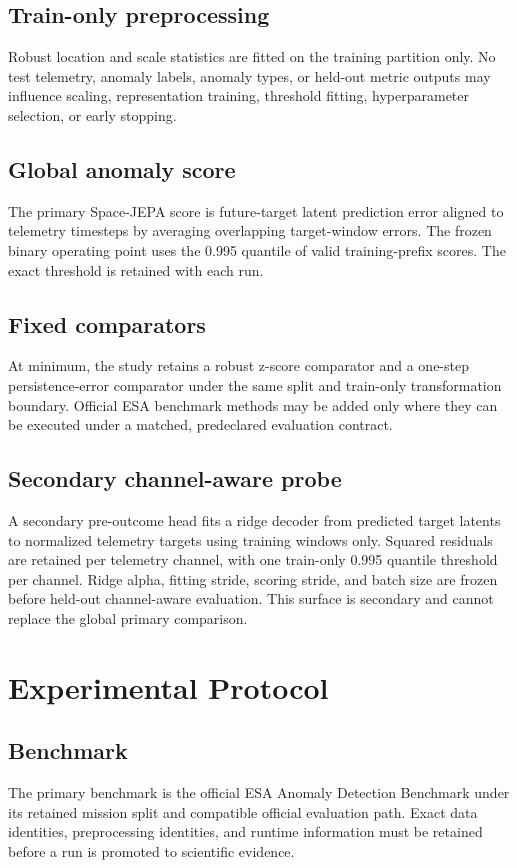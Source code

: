 \documentclass[conference]{IEEEtran}
\begin{document}
\subsection{Train-only preprocessing}
Robust location and scale statistics are fitted on the training partition only. No test telemetry, anomaly labels, anomaly types, or held-out metric outputs may influence scaling, representation training, threshold fitting, hyperparameter selection, or early stopping.

\subsection{Global anomaly score}
The primary Space-JEPA score is future-target latent prediction error aligned to telemetry timesteps by averaging overlapping target-window errors. The frozen binary operating point uses the 0.995 quantile of valid training-prefix scores. The exact threshold is retained with each run.

\subsection{Fixed comparators}
At minimum, the study retains a robust z-score comparator and a one-step persistence-error comparator under the same split and train-only transformation boundary. Official ESA benchmark methods may be added only where they can be executed under a matched, predeclared evaluation contract.

\subsection{Secondary channel-aware probe}
A secondary pre-outcome head fits a ridge decoder from predicted target latents to normalized telemetry targets using training windows only. Squared residuals are retained per telemetry channel, with one train-only 0.995 quantile threshold per channel. Ridge alpha, fitting stride, scoring stride, and batch size are frozen before held-out channel-aware evaluation. This surface is secondary and cannot replace the global primary comparison.

\section{Experimental Protocol}
\subsection{Benchmark}
The primary benchmark is the official ESA Anomaly Detection Benchmark under its retained mission split and compatible official evaluation path. Exact data identities, preprocessing identities, and runtime information must be retained before a run is promoted to scientific evidence.
\end{document}
